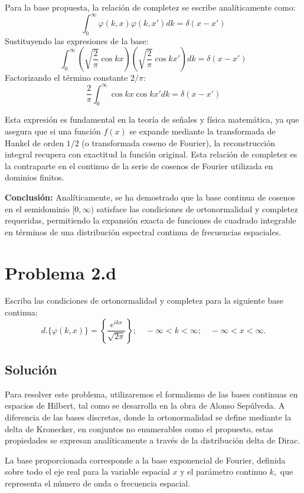 \documentclass[a4paper]{article}
\begin{document}
Para la base propuesta, la relación de completez se escribe analíticamente como:
$$ \int_{0}^{\infty} \varphi(k, x) \varphi(k, x') dk = \delta(x - x') $$
Sustituyendo las expresiones de la base:
$$ \int_{0}^{\infty} \left( \sqrt{\frac{2}{\pi}} \cos kx \right) \left( \sqrt{\frac{2}{\pi}} \cos kx' \right) dk = \delta(x - x') $$
Factorizando el término constante $2/\pi$:
$$ \frac{2}{\pi} \int_{0}^{\infty} \cos kx \cos kx' dk = \delta(x - x') $$

Esta expresión es fundamental en la teoría de señales y física matemática, ya que asegura que si una función $f(x)$ se expande mediante la transformada de Hankel de orden $1/2$ (o transformada coseno de Fourier), la reconstrucción integral recupera con exactitud la función original. Esta relación de completez es la contraparte en el continuo de la serie de cosenos de Fourier utilizada en dominios finitos.

\textbf{Conclusión:} Analíticamente, se ha demostrado que la base continua de cosenos en el semidominio $[0, \infty)$ satisface las condiciones de ortonormalidad y completez requeridas, permitiendo la expansión exacta de funciones de cuadrado integrable en términos de una distribución espectral continua de frecuencias espaciales.


\section{Problema 2.d}
Escriba las condiciones de ortonormalidad y completez para la siguiente base continua:
$$ d. \{ \varphi(k, x) \} = \left\{ \frac{e^{ikx}}{\sqrt{2\pi}} \right\} ; \quad -\infty < k < \infty; \quad -\infty < x < \infty. $$

\subsection{Solución}

Para resolver este problema, utilizaremos el formalismo de las bases continuas en espacios de Hilbert, tal como se desarrolla en la obra de Alonso Sepúlveda. A diferencia de las bases discretas, donde la ortonormalidad se define mediante la delta de Kronecker, en conjuntos no enumerables como el propuesto, estas propiedades se expresan analíticamente a través de la distribución delta de Dirac.

La base proporcionada corresponde a la base exponencial de Fourier, definida sobre todo el eje real para la variable espacial $x$ y el parámetro continuo $k,$ que representa el número de onda o frecuencia espacial.
\end{document}
